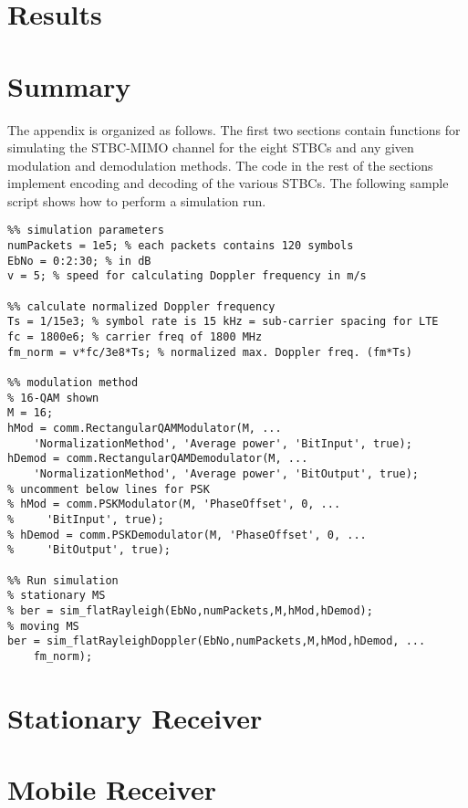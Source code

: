 \documentclass[12pt,onecolumn]{IEEEtran}
\begin{document}
\section{Results}


\clearpage
\section{Summary}




\clearpage
\appendix

The appendix is organized as follows. The first two sections contain functions for simulating the STBC-MIMO channel for the eight STBCs and any given modulation and demodulation methods. The code in the rest of the sections implement encoding and decoding of the various STBCs. The following sample script shows how to perform a simulation run.

\begin{lstlisting}
%% simulation parameters
numPackets = 1e5; % each packets contains 120 symbols
EbNo = 0:2:30; % in dB
v = 5; % speed for calculating Doppler frequency in m/s

%% calculate normalized Doppler frequency
Ts = 1/15e3; % symbol rate is 15 kHz = sub-carrier spacing for LTE
fc = 1800e6; % carrier freq of 1800 MHz
fm_norm = v*fc/3e8*Ts; % normalized max. Doppler freq. (fm*Ts)

%% modulation method
% 16-QAM shown
M = 16;
hMod = comm.RectangularQAMModulator(M, ...
    'NormalizationMethod', 'Average power', 'BitInput', true);
hDemod = comm.RectangularQAMDemodulator(M, ...
    'NormalizationMethod', 'Average power', 'BitOutput', true);
% uncomment below lines for PSK
% hMod = comm.PSKModulator(M, 'PhaseOffset', 0, ...
%     'BitInput', true);
% hDemod = comm.PSKDemodulator(M, 'PhaseOffset', 0, ...
%     'BitOutput', true);

%% Run simulation
% stationary MS
% ber = sim_flatRayleigh(EbNo,numPackets,M,hMod,hDemod);
% moving MS
ber = sim_flatRayleighDoppler(EbNo,numPackets,M,hMod,hDemod, ...
    fm_norm);
\end{lstlisting}

\appendices

\section{Stationary Receiver}

\section{Mobile Receiver}

\end{document}
